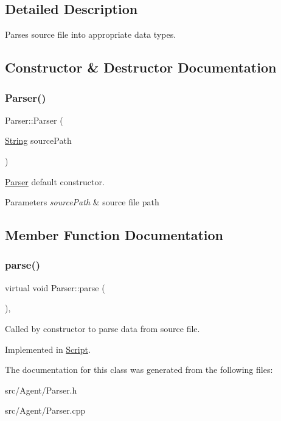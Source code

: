 \subsection{Detailed Description}
Parses source file into appropriate data types. 

\subsection{Constructor \& Destructor Documentation}
\mbox{\label{classParser_a0561a18255812c46ece89f199ce337a8}} 
\subsubsection{\texorpdfstring{Parser()}{Parser()}}
{\footnotesize\ttfamily Parser\+::\+Parser (\begin{DoxyParamCaption}\item[{\mbox{\hyperlink{classString}{String}}}]{source\+Path }\end{DoxyParamCaption})}

\mbox{\hyperlink{classParser}{Parser}} default constructor. 
\begin{DoxyParams}{Parameters}
{\em source\+Path} & source file path \\
\hline
\end{DoxyParams}


\subsection{Member Function Documentation}
\mbox{\label{classParser_a1df9aa58be0f4027a39277d78b870195}} 
\subsubsection{\texorpdfstring{parse()}{parse()}}
{\footnotesize\ttfamily virtual void Parser\+::parse (\begin{DoxyParamCaption}{ }\end{DoxyParamCaption})\hspace{0.3cm}{\ttfamily [protected]}, {}}

Called by constructor to parse data from source file. 

Implemented in \mbox{\hyperlink{classScript_a4bb2f5d77aed84a9f0dc9298894abd1c}{Script}}.



The documentation for this class was generated from the following files\+:\begin{DoxyCompactItemize}
\item 
src/\+Agent/Parser.\+h\item 
src/\+Agent/Parser.\+cpp\end{DoxyCompactItemize}
